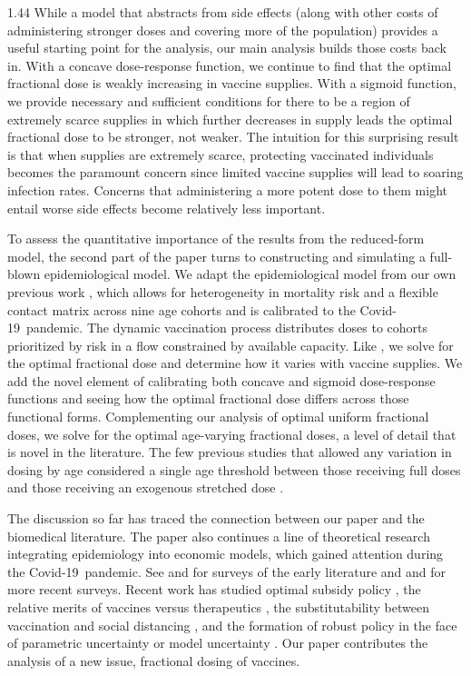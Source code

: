 \documentclass[12pt]{article}
\newcommand{\covid}{Covid-19}
\begin{document}
\begin{spacing}{1.44}
While a model that abstracts from side effects (along with other costs
of administering stronger doses and covering more of the population)
provides a useful starting point for the analysis, our main analysis
builds those costs back in. With a concave dose-response function, we
continue to find that the optimal fractional dose is weakly increasing
in vaccine supplies. With a sigmoid function, we provide necessary and
sufficient conditions for there to be a region of extremely scarce
supplies in which further decreases in supply leads the optimal
fractional dose to be stronger, not weaker. The intuition for this
surprising result is that when supplies are extremely scarce,
protecting vaccinated individuals becomes the paramount concern since
limited vaccine supplies will lead to soaring infection
rates. Concerns that administering a more potent dose to them might
entail worse side effects become relatively less important.

To assess the quantitative importance of the results from the
reduced-form model, the second part of the paper turns to constructing
and simulating a full-blown epidemiological model. We adapt the
epidemiological model from our own previous work \citet{Wiecek2022},
which allows for heterogeneity in mortality risk and a flexible
contact matrix across nine age cohorts and is calibrated to the
\covid\ pandemic. The dynamic vaccination process distributes doses to
cohorts prioritized by risk in a flow constrained by available
capacity. Like \citet{Riley2007}, we solve for the optimal fractional
dose and determine how it varies with vaccine supplies. We add the
novel element of calibrating both concave and sigmoid dose-response
functions and seeing how the optimal fractional dose differs across
those functional forms.  Complementing our analysis of optimal uniform
fractional doses, we solve for the optimal age-varying fractional
doses, a level of detail that is novel in the literature. The few
previous studies that allowed any variation in dosing by age
considered a single age threshold between those receiving full doses
and those receiving an exogenous stretched dose
\citep{Wu2016,Leung2022}.

The discussion so far has traced the connection between our paper and
the biomedical literature. The paper also continues a line of
theoretical research integrating epidemiology into economic models,
which gained attention during the \covid\ pandemic. See
\citet{Philipson2000} and \citet{Philipson2016} for surveys of the
early literature and \citet{McAdams2021} and \citet{Avery2024} for
more recent surveys.  Recent work has studied optimal subsidy policy
\citep{Goodkin-Gold2024}, the relative merits of vaccines versus
therapeutics \citep{LaTorre2020,Toxvaerd2022}, the substitutability
between vaccination and social distancing
\citep{Atkeson2021,Avery2024}, and the formation of robust policy in
the face of parametric uncertainty
\citep{Manski2020} or model uncertainty \citep{Gans2022,Budish2025}. Our paper contributes the analysis of a
new issue, fractional dosing of vaccines.


\end{spacing}
\end{document}
